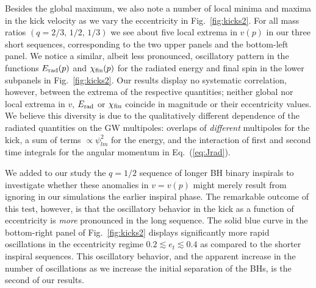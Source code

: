 \documentclass[floats,floatfix,showpacs,amssymb,physrev,twocolumn,superscriptaddress,reprint,
nofootinbib, longbibliography]{revtex4-2}
\begin{document}
Besides the global maximum, we also note a number of local minima and
maxima in the kick velocity as we vary the eccentricity in
Fig.~\ref{fig:kicks2}. For all mass ratios $(q=2/3,\,1/2,\,1/3)$ we
see about five 
local extrema in $v(p)$ in our three short sequences,
corresponding to the two upper panels and the bottom-left panel.
We notice a similar, albeit less pronounced,
oscillatory pattern in the functions
$E_{\rm rad}(p)$ and $\chi_{\rm fin}(p)$ for the radiated
energy and final spin in the lower subpanels in
Fig.~\ref{fig:kicks2}. Our results display no systematic
correlation, however, between the extrema of the respective
quantities; neither global nor local extrema in $v$,
$E_{\rm rad}$ or $\chi_{\rm fin}$ coincide in
magnitude or their eccentricity values.
We believe this diversity is due to the qualitatively
different dependence of the radiated quantities on the
GW multipoles: overlaps of {\it different} multipoles for the
kick, a sum of terms $\propto \psi_{lm}^2$ for the energy,
and the interaction of first and second time integrals
for the angular momentum in Eq.~(\ref{eq:Jrad}).

We added
to our study the $q = 1/2$ sequence of longer BH binary inspirals to
investigate whether these anomalies in $v=v(p)$ might merely result
from ignoring in our simulations the earlier inspiral phase. The
remarkable outcome of this test, however, is that the oscillatory
behavior in the kick as a function of eccentricity is \emph{more}
pronounced in the long sequence.  The solid blue curve in the
bottom-right panel of Fig.~\ref{fig:kicks2} displays significantly more
rapid oscillations in the eccentricity regime
$0.2\lesssim e_t \lesssim 0.4$ as compared to the shorter inspiral
sequences.  This oscillatory behavior, and the apparent increase in
the number of oscillations as we increase the initial separation of
the BHs, is the second of our results.
\end{document}
